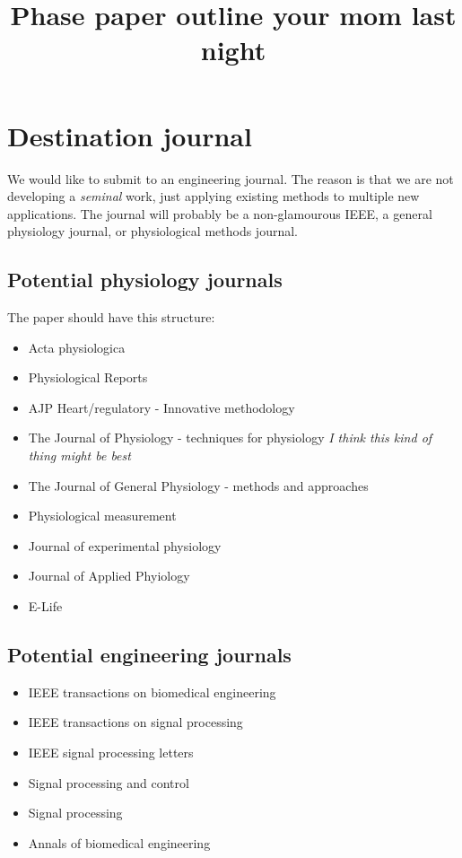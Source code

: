 \documentclass{article}
\title{Phase paper outline your mom last night}
\author{}
\date{}
\begin{document}
\maketitle

\section*{Destination journal}
We would like to submit to an engineering journal. The reason is that we are not developing a \textit{seminal} work, just applying existing methods to multiple new applications. The journal will probably be a non-glamourous IEEE, a general physiology journal, or physiological methods journal. 

\subsection*{Potential physiology journals}
The paper should have this structure:\cite{muller_estimation_2003}
\begin{itemize}
\item Acta physiologica
\item Physiological Reports
\item AJP Heart/regulatory - Innovative methodology
\item The Journal of Physiology - techniques for physiology \textit{I think this kind of thing might be best}
\item The Journal of General Physiology - methods and approaches
\item Physiological measurement
\item Journal of experimental physiology
\item Journal of Applied Phyiology
\item E-Life
\end{itemize}

\subsection*{Potential engineering journals}
\begin{itemize}
\item IEEE transactions on biomedical engineering
\item IEEE transactions on signal processing
\item IEEE signal processing letters
\item Signal processing and control
\item Signal processing
\item Annals of biomedical engineering
\end{itemize}
\end{document}
